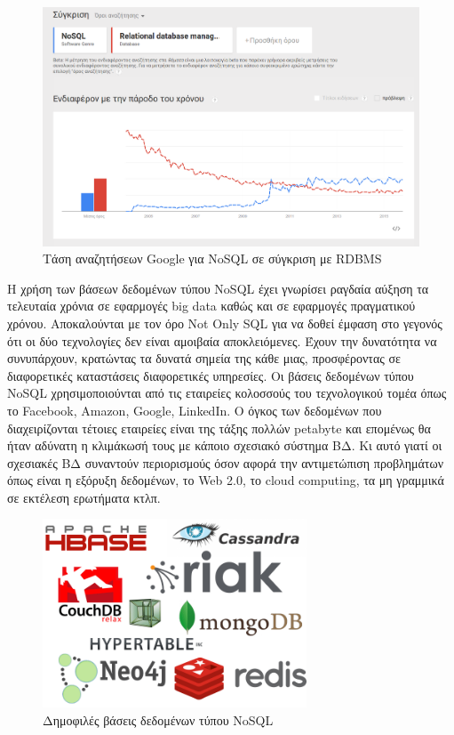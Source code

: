 	\begin{figure}[h]
	    \centering
	    \includegraphics[width=1\textwidth]{nosql_vs_rdbms.png}
	    \caption{Τάση αναζητήσεων Google για NoSQL σε σύγκριση με RDBMS}
	    \label{fig:NoSQL-DBs}
	\end{figure}
	
	Η χρήση των βάσεων δεδομένων τύπου NoSQL έχει γνωρίσει ραγδαία αύξηση τα τελευταία χρόνια σε εφαρμογές big data καθώς και σε εφαρμογές πραγματικού χρόνου. Αποκαλούνται με τον όρο Not Only SQL για να δοθεί έμφαση στο γεγονός ότι οι δύο τεχνολογίες δεν είναι αμοιβαία αποκλειόμενες. Έχουν την δυνατότητα να συνυπάρχουν, κρατώντας τα δυνατά σημεία της κάθε μιας, προσφέροντας σε διαφορετικές καταστάσεις διαφορετικές υπηρεσίες. Οι βάσεις δεδομένων τύπου NoSQL χρησιμοποιούνται από τις εταιρείες κολοσσούς του τεχνολογικού τομέα όπως το Facebook, Amazon, Google, LinkedIn\cite{5993686}. Ο όγκος των δεδομένων που διαχειρίζονται τέτοιες εταιρείες είναι της τάξης πολλών petabyte και επομένως θα ήταν αδύνατη η κλιμάκωσή τους με κάποιο σχεσιακό σύστημα ΒΔ. Κι αυτό γιατί οι σχεσιακές ΒΔ συναντούν περιορισμούς όσον αφορά την αντιμετώπιση προβλημάτων όπως είναι η εξόρυξη δεδομένων, το Web 2.0, το cloud computing, τα μη γραμμικά σε εκτέλεση ερωτήματα κτλπ.
	
	\begin{figure}[h]
	    \centering
	    \includegraphics[width=0.7\textwidth]{NoSQL-DBs.png}
	    \caption{Δημοφιλές βάσεις δεδομένων τύπου NoSQL }
	    \label{fig:NoSQL-DBs}
	\end{figure}
	
